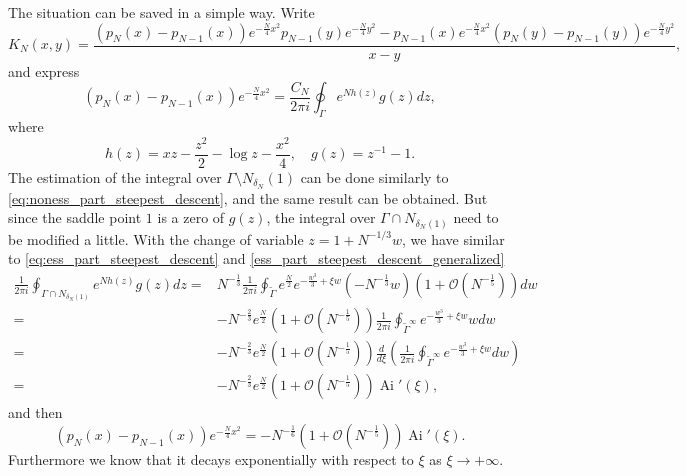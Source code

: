 \documentclass[11pt, a4paper]{article}
\numberwithin{equation}{section}
\newcommand{\bigO}{\mathcal{O}}
\DeclareMathOperator{\Ai}{Ai}
\theoremstyle{definition}
\theoremstyle{remark}
\begin{document}
The situation can be saved in a simple way. Write
\begin{equation} \label{eq:alternative_K_N}
    K_N(x, y) = \frac{(p_N(x) - p_{N - 1}(x))e^{-\frac{N}{4}x^2} p_{N - 1}(y)e^{-\frac{N}{4}y^2} - p_{N - 1}(x)e^{-\frac{N}{4}x^2} (p_N(y) - p_{N - 1}(y))e^{-\frac{N}{4}y^2}}{x - y},
\end{equation}
and express
\begin{equation}
  (p_N(x) - p_{N - 1}(x))e^{-\frac{N}{4}x^2} = \frac{C_N}{2\pi i} \oint_{\Gamma} e^{N h(z)} g(z) dz,
\end{equation}
where
\begin{equation}
  h(z) = xz - \frac{z^2}{2} - \log z - \frac{x^2}{4}, \quad g(z) = z^{-1} - 1.
\end{equation}
The estimation of the integral over $\Gamma \setminus N_{\delta_N}(1)$ can be done similarly to \eqref{eq:noness_part_steepest_descent}, and the same result can be obtained. But since the saddle point $1$ is a zero of $g(z)$, the integral over $\Gamma \cap N_{\delta_N(1)}$ need to be modified a little. With the change of variable $z = 1 + N^{-1/3}w$, we have similar to \eqref{eq:ess_part_steepest_descent} and \eqref{ess_part_steepest_descent_generalized}
\begin{equation}
  \begin{split}
    \frac{1}{2\pi i} \oint_{\Gamma \cap N_{\delta_N(1)}} e^{Nh(z)} g(z) dz = {}& N^{-\frac{1}{3}} \frac{1}{2\pi i} \oint_{\tilde{\Gamma}} e^{\frac{N}{2}} e^{-\frac{w^3}{3} + \xi w} (-N^{-\frac{1}{3}}w) (1 + \bigO(N^{-\frac{1}{5}})) dw \\
    = {}& -N^{-\frac{2}{3}}  e^{\frac{N}{2}} (1 + \bigO(N^{-\frac{1}{5}})) \frac{1}{2\pi i} \oint_{\tilde{\Gamma}^{\infty}} e^{-\frac{w^3}{3} + \xi w} w dw \\
    = {}& -N^{-\frac{2}{3}}  e^{\frac{N}{2}} (1 + \bigO(N^{-\frac{1}{5}})) \frac{d}{d\xi} \left( \frac{1}{2\pi i} \oint_{\tilde{\Gamma}^{\infty}} e^{-\frac{w^3}{3} + \xi w} dw \right) \\
    = {}& -N^{-\frac{2}{3}}  e^{\frac{N}{2}} (1 + \bigO(N^{-\frac{1}{5}})) \Ai'(\xi),
  \end{split}
\end{equation}
and then
\begin{equation} \label{eq:asy_of_p_N-p_N-1}
  (p_N(x) - p_{N - 1}(x))e^{-\frac{N}{4}x^2} = -N^{-\frac{1}{6}}  (1 + \bigO(N^{-\frac{1}{5}})) \Ai'(\xi).
\end{equation}
Furthermore we know that it decays exponentially with respect to $\xi$ as $\xi \to +\infty$.
\end{document}
